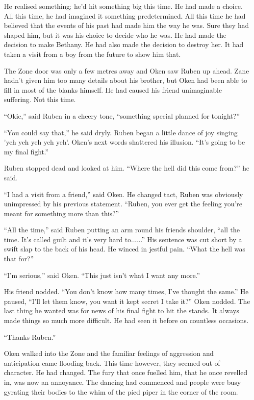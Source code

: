 He realised something; he'd hit something big this time.  He had made a choice.  All this time, he had imagined it something predetermined.  All this time he had believed that the events of his past had made him the way he was.  Sure they had shaped him, but it was his choice to decide who he was.  He had made the decision to make Bethany.  He had also made the decision to destroy her.  It had taken a visit from a boy from the future to show him that.

The Zone door was only a few metres away and Oken saw Ruben up ahead.  Zane hadn't given him too many details about his brother, but Oken had been able to fill in most of the blanks himself.  He had caused his friend unimaginable suffering.  Not this time.

``Okie,'' said Ruben in a cheery tone, ``something special planned for tonight?''

``You could say that,'' he said dryly.  Ruben began a little dance of joy singing 'yeh yeh yeh yeh yeh'.  Oken's next words shattered his illusion.  ``It's going to be my final fight.''

Ruben stopped dead and looked at him.  ``Where the hell did this come from?'' he said.

``I had a visit from a friend,'' said Oken.  He changed tact, Ruben was obviously unimpressed by his previous statement. ``Ruben, you ever get the feeling you're meant for something more than this?''

``All the time,'' said Ruben putting an arm round his friends shoulder, ``all the time.  It's called guilt and it's very hard to......''  His sentence was cut short by a swift slap to the back of his head.  He winced in jestful pain.  ``What the hell was that for?''

``I'm serious,'' said Oken.  ``This just isn't what I want any more.'' 

His friend nodded.  ``You don't know how many times, I've thought the same.''  He paused, ``I'll let them know, you want it kept secret I take it?''  Oken nodded.  The last thing he wanted was for news of his final fight to hit the stands.  It always made things so much more difficult.  He had seen it before on countless occasions.

``Thanks Ruben.''

Oken walked into the Zone and the familiar feelings of aggression and anticipation came flooding back.  This time however, they seemed out of character.  He had changed.  The fury that once fuelled him, that he once revelled in, was now an annoyance.  The dancing had commenced and people were busy gyrating their bodies to the whim of the pied piper in the corner of the room.  



